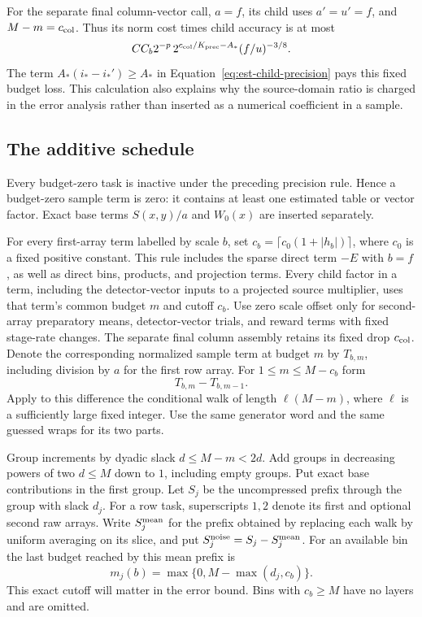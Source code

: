 For the separate final column-vector call, $a=f$, its child uses
$a'=u'=f$, and $M-m=c_{\rm col}$.  Thus its norm cost times child
accuracy is at most
\[
 C C_b2^{-p}\,2^{c_{\rm col}/K_{\rm prec}-A_*}
       (f/u)^{-3/8}.
\]
The term $A_*(i_*-i_*')\ge A_*$ in Equation~\eqref{eq:est-child-precision}
pays this fixed budget loss.  This calculation
also explains why the source-domain ratio is charged in the error
analysis rather than inserted as a numerical coefficient in a sample.

\subsection{The additive schedule}

Every budget-zero task is inactive under the preceding precision rule.
Hence a budget-zero sample term is zero: it contains at least one
estimated table or vector factor.  Exact base terms $S(x,y)/a$ and
$W_0(x)$ are inserted separately.

For every first-array term labelled by scale $b$, set
$c_b=\lceil c_0(1+|h_b|)\rceil$, where $c_0$ is a fixed positive constant.
This rule includes the sparse direct term $-E$ with $b=f$, as well as
direct bins, products, and projection terms.  Every child factor in a
term, including the detector-vector inputs to a projected source
multiplier, uses that term's common budget $m$ and cutoff $c_b$.
Use zero scale offset only for second-array preparatory means,
detector-vector trials, and reward terms with fixed stage-rate changes.
The separate final column assembly retains its fixed drop
$c_{\rm col}$.  Denote the corresponding normalized
sample term at budget $m$ by $T_{b,m}$, including division by $a$ for the
first row array.  For $1\le m\le M-c_b$ form
\begin{equation}
 T_{b,m}-T_{b,m-1}.
 \label{eq:est-difference}
\end{equation}
Apply to this difference the conditional walk of length
$\ell(M-m)$, where $\ell$ is a sufficiently large fixed integer.  Use the
same generator word and the same guessed wraps for its two parts.

Group increments by dyadic slack
$d\le M-m<2d$.  Add groups in decreasing powers of two $d\le M$ down to
$1$, including empty groups.  Put exact base contributions in the first
group.  Let $S_j$ be the uncompressed prefix through the group with slack
$d_j$. For a row task, superscripts $1,2$ denote its first and optional
second raw arrays. Write $S_j^{\rm mean}$ for the prefix obtained by
replacing each walk by uniform averaging on its slice, and put
$S_j^{\rm noise}=S_j-S_j^{\rm mean}$.
For an available bin the last budget reached by this mean prefix is
\begin{equation}
 m_j(b)=\max\{0,M-\max(d_j,c_b)\}.
 \label{eq:est-last-budget}
\end{equation}
This exact cutoff will matter in the error bound.  Bins with $c_b\ge M$
have no layers and are omitted.


